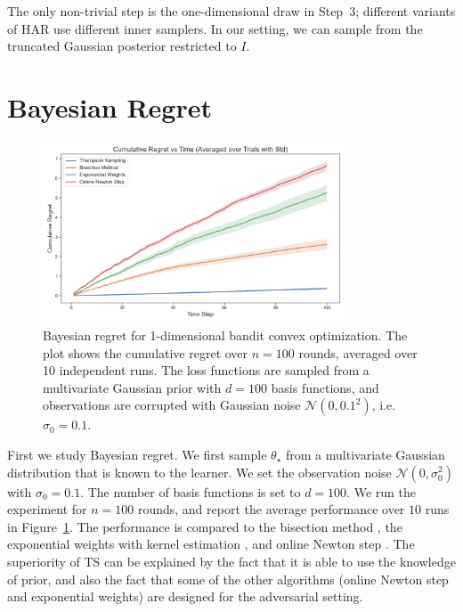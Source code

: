 \documentclass[letter, 12pt]{report}
\newcommand{\1}{\mathbf{1}}
\newcommand{\ts}{\textsc{TS}\xspace}
\theoremstyle{plain}
\theoremstyle{definition}
\theoremstyle{remark}
\begin{document}
The only non-trivial step is the one-dimensional draw in Step~3;
different variants of HAR use different inner samplers.
In our setting, we can sample from the truncated Gaussian posterior
restricted to $I$.

\section{Bayesian Regret}
\label{sec:ts-empirical-results-bayesian}
\begin{figure}[t!]
    \centering
    \includegraphics[width=0.8\textwidth]{figures/bayesian_regret.png}
    \caption{Bayesian regret for 1-dimensional bandit convex optimization.
        The plot shows the cumulative regret over $n = 100$ rounds, averaged over 10 independent runs.
        The loss functions are sampled from a multivariate Gaussian prior with $d = 100$ basis functions,
        and observations are corrupted with Gaussian noise $\mathcal{N}(0, 0.1^2)$,
        i.e. $\sigma_0 = 0.1$.
    }
    \label{fig:bayesian-regret}
\end{figure}
First we study Bayesian regret.
We first sample $\theta_\star$ from a multivariate Gaussian distribution
that is known to the learner.
We set the observation noise $\mathcal{N}(0, \sigma_0^2)$
with $\sigma_0 = 0.1$.
The number of basis functions is set to $d = 100$.
We run the experiment for $n = 100$ rounds,
and report the average performance over $10$ runs in Figure~\ref{fig:bayesian-regret}.
The performance is compared to the bisection method \citep{agarwal2010optimal},
the exponential weights with kernel estimation \citep{BEL16}, and
online Newton step \citep{LFMV24-improved}.
The superiority of \ts can be explained by the fact that
it is able to use the knowledge of prior, and also the fact that
some of the other algorithms (online Newton step and exponential weights) are designed for the adversarial setting.
\end{document}
